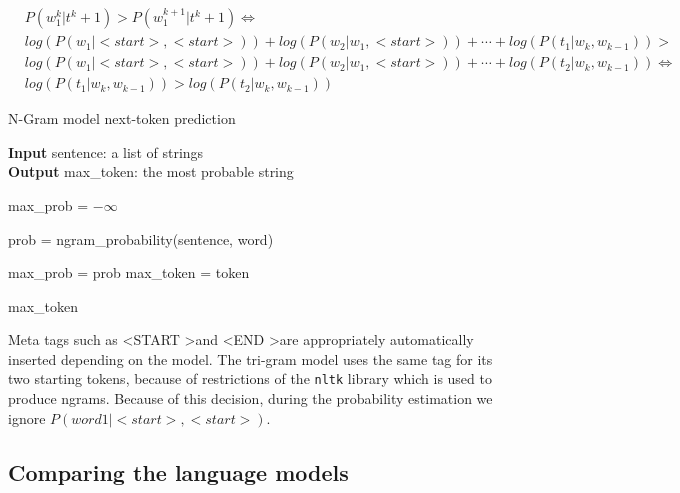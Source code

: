 \documentclass[11pt, a4paper]{article}
\begin{document}
	\begin{equation}
		\label{eq::trigram_sentence_probs}
		\begin{aligned}
			&  P(w^{k}_1 | t^k+1) > P(w^{k+1}_1 | t^k+1) \iff \\
			& log(P(w_1|<start>, <start>)) + log(P(w_2|w_1, <start>)) + \cdots + log(P(t_1|w_k, w_{k-1})) > \\ 
			& log(P(w_1|<start>, <start>)) + log(P(w_2|w_1, <start>)) + \cdots + log(P(t_2|w_k, w_{k-1})) \iff \\
			& log(P(t_1|w_k, w_{k-1})) > log(P(t_2|w_k, w_{k-1}))
		\end{aligned}
	\end{equation}
	
	
	
	\begin{algorithm}
		\caption{N-Gram model next-token prediction} 
		\label{al::next_token}
		
		\hspace*{\algorithmicindent} \textbf{Input} sentence: a list of strings\\
		\hspace*{\algorithmicindent} \textbf{Output} max\_token: the most probable string
		\begin{algorithmic}[1]
			
			\State max\_prob = $-\infty$
			
			
					\State prob = ngram\_probability(sentence, word)
					
						\State max\_prob = prob
						\State max\_token = token
					\EndIf
				
				\EndIf
			
			\EndFor
			
			\State \Return max\_token
		\end{algorithmic} 
	\end{algorithm}
	
	
	Meta tags such as \textless START \textgreater  and \textless END \textgreater  are appropriately automatically inserted depending on the model. The tri-gram model uses the same tag for its two starting tokens, because of restrictions of the \texttt{nltk} library which is used to produce ngrams. Because of this decision, during the probability estimation we ignore $P(word1 | <start>, <start>)$.
	
	
	\subsection{Comparing the language models}
	
\end{document}
